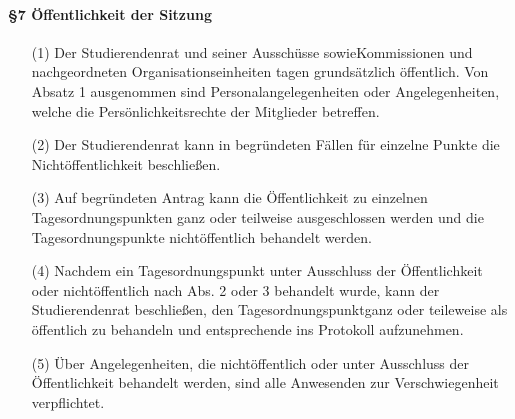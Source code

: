         \paragraph{§7 Öffentlichkeit der Sitzung}
            \begin{itemize}
                \item[(1)] Der Studierendenrat und seiner Ausschüsse sowieKommissionen und nachgeordneten Organisationseinheiten tagen grundsätzlich öffentlich. Von Absatz 1 ausgenommen sind Personalangelegenheiten oder Angelegenheiten, welche die Persönlichkeitsrechte der Mitglieder betreffen.
                \item[(2)] Der Studierendenrat kann in begründeten Fällen für einzelne Punkte die Nichtöffentlichkeit beschließen.
                \item[(3)] Auf begründeten Antrag kann die Öffentlichkeit zu einzelnen Tagesordnungspunkten ganz oder teilweise ausgeschlossen werden und die Tagesordnungspunkte nichtöffentlich behandelt werden.
                \item[(4)] Nachdem ein Tagesordnungspunkt unter Ausschluss der Öffentlichkeit oder nichtöffentlich nach Abs. 2  oder 3 behandelt wurde, kann der Studierendenrat beschließen, den Tagesordnungspunktganz oder teileweise als öffentlich zu behandeln und entsprechende ins Protokoll aufzunehmen.
                \item[(5)] Über Angelegenheiten, die nichtöffentlich oder unter Ausschluss der Öffentlichkeit behandelt werden, sind alle Anwesenden zur Verschwiegenheit verpflichtet.  
            \end{itemize}
